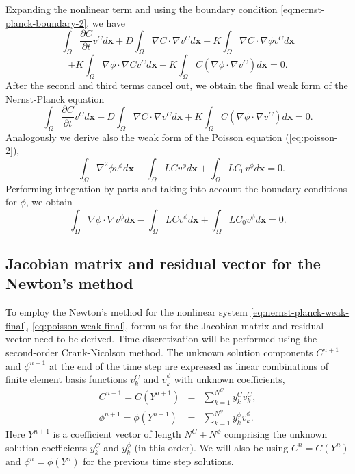 Expanding the nonlinear term and using the boundary condition 
\eqref{eq:nernst-planck-boundary-2}, we have
$$
  \int_{\Omega}\frac{\partial C}{\partial t}v^C d\mathbf{x}+
  D\int_{\Omega}\nabla C \cdot \nabla v^C d\mathbf{x}-
  K\int_{\Omega}\nabla C \cdot \nabla \phi v^C d\mathbf{x}
$$
\begin{equation}
  + K\int_{\Omega}\nabla \phi \cdot \nabla C v^C d\mathbf{x}+
  K\int_{\Omega} C \left(\nabla\phi\cdot\nabla v^C\right) d\mathbf{x}=0.
  \label{eq:nernst-planck-weak3}
\end{equation}
After the second and third terms cancel out, we obtain the final weak form of 
the Nernst-Planck equation
\begin{equation}
  \int_{\Omega}\frac{\partial C}{\partial t}v^C d\mathbf{x}+
  D\int_{\Omega}\nabla C \cdot \nabla v^C d\mathbf{x}+
  K\int_{\Omega} C \left(\nabla\phi\cdot\nabla v^C\right) d\mathbf{x}=0.
  \label{eq:nernst-planck-weak-final}
\end{equation}
Analogously we derive also the weak form of the Poisson equation (\ref{eq:poisson-2}),
\begin{equation}
  -\int_{\Omega}\nabla^2\phi v^\phi d\mathbf{x}-\int_{\Omega}LCv^\phi d\mathbf{x}+
  \int_{\Omega}LC_{0}v^\phi d\mathbf{x}=0.
  \label{eq:poisson-weak1}
\end{equation}
Performing integration by parts and taking into account the boundary 
conditions for $\phi$, we obtain
\begin{equation}
  \int_{\Omega}\nabla\phi\cdot\nabla v^\phi d\mathbf{x}-\int_{\Omega}LCv^\phi d\mathbf{x}+
  \int_{\Omega}LC_{0}v^\phi d\mathbf{x}=0.
  \label{eq:poisson-weak-final}
\end{equation}


\subsection{Jacobian matrix and residual vector for the Newton's method}
To employ the Newton's method for the nonlinear system \eqref{eq:nernst-planck-weak-final},
\eqref{eq:poisson-weak-final}, formulas for the Jacobian matrix and residual vector need to
be derived. Time discretization will be performed using the second-order Crank-Nicolson 
method. The unknown solution components 
$C^{n+1}$ and $\phi^{n+1}$ at the end of the time step are expressed 
as linear combinations of finite element basis functions $v_k^{C}$ 
and $v_k^{\phi}$ with unknown coefficients,
\begin{eqnarray}
  C^{n+1} = C(Y^{n+1}) &=& \sum_{k=1}^{N^C} y_k^{C} v_k^{C}, \label{eq:cnotation}\\
  \phi^{n+1} = \phi(Y^{n+1}) &=& \sum_{k=1}^{N^{\phi}} y_k^{\phi} v_k^{\phi}\label{eq:phinotation}.
\end{eqnarray}
Here $Y^{n+1}$ is a coefficient vector of length $N^C + N^{\phi}$ comprising the unknown 
solution coefficients $y_k^{C}$ and $y_k^{\phi}$ (in this order). We will also be 
using $C^n = C(Y^n)$ and $\phi^n = \phi(Y^n)$ for the previous time step solutions.

